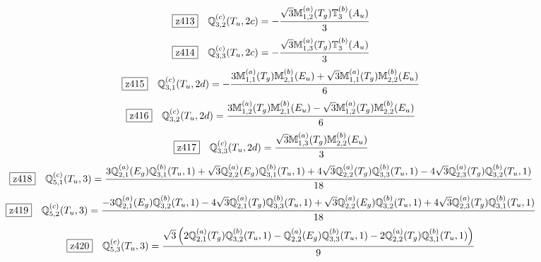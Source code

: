 \documentclass[fleqn,10pt,landscape]{jsarticle}
\begin{document}
\begin{dmath*}
\hspace*{3mm}\fbox{z413}\quad \mathbb{Q}_{3,2}^{(c)}(T_{u},2c)=- \frac{\sqrt{3} \mathbb{M}_{1,2}^{(a)}(T_{g}) \mathbb{T}_{3}^{(b)}(A_{u})}{3}
\end{dmath*}
\begin{dmath*}
\hspace*{3mm}\fbox{z414}\quad \mathbb{Q}_{3,3}^{(c)}(T_{u},2c)=- \frac{\sqrt{3} \mathbb{M}_{1,3}^{(a)}(T_{g}) \mathbb{T}_{3}^{(b)}(A_{u})}{3}
\end{dmath*}
\begin{dmath*}
\hspace*{3mm}\fbox{z415}\quad \mathbb{Q}_{3,1}^{(c)}(T_{u},2d)=- \frac{3 \mathbb{M}_{1,1}^{(a)}(T_{g}) \mathbb{M}_{2,1}^{(b)}(E_{u}) + \sqrt{3} \mathbb{M}_{1,1}^{(a)}(T_{g}) \mathbb{M}_{2,2}^{(b)}(E_{u})}{6}
\end{dmath*}
\begin{dmath*}
\hspace*{3mm}\fbox{z416}\quad \mathbb{Q}_{3,2}^{(c)}(T_{u},2d)=\frac{3 \mathbb{M}_{1,2}^{(a)}(T_{g}) \mathbb{M}_{2,1}^{(b)}(E_{u}) - \sqrt{3} \mathbb{M}_{1,2}^{(a)}(T_{g}) \mathbb{M}_{2,2}^{(b)}(E_{u})}{6}
\end{dmath*}
\begin{dmath*}
\hspace*{3mm}\fbox{z417}\quad \mathbb{Q}_{3,3}^{(c)}(T_{u},2d)=\frac{\sqrt{3} \mathbb{M}_{1,3}^{(a)}(T_{g}) \mathbb{M}_{2,2}^{(b)}(E_{u})}{3}
\end{dmath*}
\begin{dmath*}
\hspace*{3mm}\fbox{z418}\quad \mathbb{Q}_{5,1}^{(c)}(T_{u},3)=\frac{3 \mathbb{Q}_{2,1}^{(a)}(E_{g}) \mathbb{Q}_{3,1}^{(b)}(T_{u},1) + \sqrt{3} \mathbb{Q}_{2,2}^{(a)}(E_{g}) \mathbb{Q}_{3,1}^{(b)}(T_{u},1) + 4 \sqrt{3} \mathbb{Q}_{2,2}^{(a)}(T_{g}) \mathbb{Q}_{3,3}^{(b)}(T_{u},1) - 4 \sqrt{3} \mathbb{Q}_{2,3}^{(a)}(T_{g}) \mathbb{Q}_{3,2}^{(b)}(T_{u},1)}{18}
\end{dmath*}
\begin{dmath*}
\hspace*{3mm}\fbox{z419}\quad \mathbb{Q}_{5,2}^{(c)}(T_{u},3)=\frac{- 3 \mathbb{Q}_{2,1}^{(a)}(E_{g}) \mathbb{Q}_{3,2}^{(b)}(T_{u},1) - 4 \sqrt{3} \mathbb{Q}_{2,1}^{(a)}(T_{g}) \mathbb{Q}_{3,3}^{(b)}(T_{u},1) + \sqrt{3} \mathbb{Q}_{2,2}^{(a)}(E_{g}) \mathbb{Q}_{3,2}^{(b)}(T_{u},1) + 4 \sqrt{3} \mathbb{Q}_{2,3}^{(a)}(T_{g}) \mathbb{Q}_{3,1}^{(b)}(T_{u},1)}{18}
\end{dmath*}
\begin{dmath*}
\hspace*{3mm}\fbox{z420}\quad \mathbb{Q}_{5,3}^{(c)}(T_{u},3)=\frac{\sqrt{3} \left(2 \mathbb{Q}_{2,1}^{(a)}(T_{g}) \mathbb{Q}_{3,2}^{(b)}(T_{u},1) - \mathbb{Q}_{2,2}^{(a)}(E_{g}) \mathbb{Q}_{3,3}^{(b)}(T_{u},1) - 2 \mathbb{Q}_{2,2}^{(a)}(T_{g}) \mathbb{Q}_{3,1}^{(b)}(T_{u},1)\right)}{9}
\end{dmath*}
\end{document}
